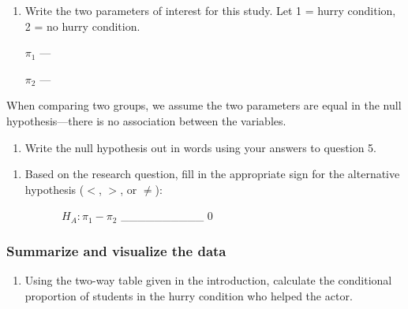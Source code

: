 \documentclass[
]{report}
\providecommand{\tightlist}{%
  \setlength{\itemsep}{0pt}\setlength{\parskip}{0pt}}
\begin{document}
\newpage

\begin{enumerate}
\def\labelenumi{\arabic{enumi}.}
\setcounter{enumi}{4}
\item
  Write the two parameters of interest for this study. Let 1 = hurry condition, 2 = no hurry condition.
  \vspace{1mm}

  \(\pi_1\) ---
  \vspace{0.5in}

  \(\pi_2\) ---
  \vspace{0.5in}
\end{enumerate}

When comparing two groups, we assume the two parameters are equal in the null hypothesis---there is no association between the variables.

\begin{enumerate}
\def\labelenumi{\arabic{enumi}.}
\setcounter{enumi}{5}
\tightlist
\item
  Write the null hypothesis out in words using your answers to question 5.
\end{enumerate}

\vspace{0.8in}

\begin{enumerate}
\def\labelenumi{\arabic{enumi}.}
\setcounter{enumi}{6}
\tightlist
\item
  Based on the research question, fill in the appropriate sign for the alternative hypothesis (\(<\), \(>\), or \(\neq\)):
  \vspace{0.1in}
\end{enumerate}

~~~~~~~~~~\(H_A: \pi_1 -\pi_2\) \_\_\_\_\_\_\_\_\_\_ 0

\hypertarget{summarize-and-visualize-the-data-1}{%
\subsubsection*{Summarize and visualize the data}\label{summarize-and-visualize-the-data-1}}

\begin{enumerate}
\def\labelenumi{\arabic{enumi}.}
\setcounter{enumi}{7}
\tightlist
\item
  Using the two-way table given in the introduction, calculate the conditional proportion of students in the hurry condition who helped the actor.
\end{enumerate}
\end{document}
